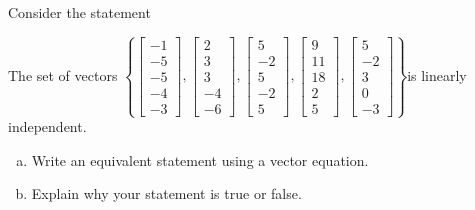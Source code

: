 
\begin{exerciseStatement}


Consider the statement 
\begin{center}\begin{minipage}{0.8\textwidth}
 The set of vectors \( \left\{ \left[\begin{array}{c}
-1 \\
-5 \\
-5 \\
-4 \\
-3
\end{array}\right] , \left[\begin{array}{c}
2 \\
3 \\
3 \\
-4 \\
-6
\end{array}\right] , \left[\begin{array}{c}
5 \\
-2 \\
5 \\
-2 \\
5
\end{array}\right] , \left[\begin{array}{c}
9 \\
11 \\
18 \\
2 \\
5
\end{array}\right] , \left[\begin{array}{c}
5 \\
-2 \\
3 \\
0 \\
-3
\end{array}\right] \right\} \)is linearly independent.
\end{minipage}\end{center}
    


\begin{enumerate}[(a)]
\item  Write an equivalent statement using a vector equation.
\item  Explain why your statement is true or false.
\end{enumerate}
    
\end{exerciseStatement}
    
